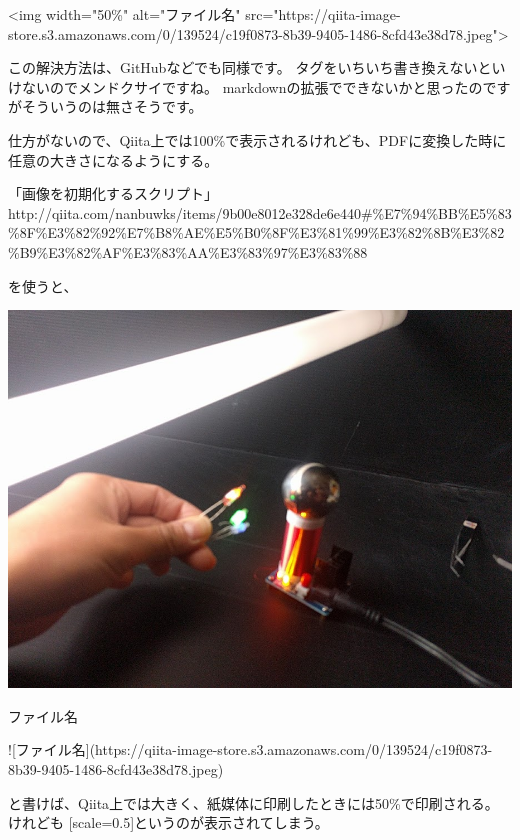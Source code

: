 \textless{}img width="50\%" alt="ファイル名" src="https://qiita{-}image{-}store.s3.amazonaws.com/0/139524/c19f0873{-}8b39{-}9405{-}1486{-}8cfd43e38d78.jpeg"\textgreater{}

この解決方法は、GitHubなどでも同様です。
タグをいちいち書き換えないといけないのでメンドクサイですね。
markdownの拡張でできないかと思ったのですがそういうのは無さそうです。

仕方がないので、Qiita上では100\%で表示されるけれども、PDFに変換した時に任意の大きさになるようにする。

「画像を初期化するスクリプト」
http://qiita.com/nanbuwks/items/9b00e8012e328de6e440\#\%E7\%94\%BB\%E5\%83\%8F\%E3\%82\%92\%E7\%B8\%AE\%E5\%B0\%8F\%E3\%81\%99\%E3\%82\%8B\%E3\%82\%B9\%E3\%82\%AF\%E3\%83\%AA\%E3\%83\%97\%E3\%83\%88

を使うと、

\begin{reviewimage}
\includegraphics[width=0.5\maxwidth]{./images/c19f0873-8b39-9405-1486-8cfd43e38d78.jpeg}
\caption{ファイル名}
\label{image:qiita2review:c19f0873-8b39-9405-1486-8cfd43e38d78}
\end{reviewimage}

\begin{reviewemlist}
[scale=0.5]![ファイル名](https://qiita{-}image{-}store.s3.amazonaws.com/0/139524/c19f0873{-}8b39{-}9405{-}1486{-}8cfd43e38d78.jpeg)
\end{reviewemlist}

と書けば、Qiita上では大きく、紙媒体に印刷したときには50\%で印刷される。
けれども
[scale=0.5]というのが表示されてしまう。

